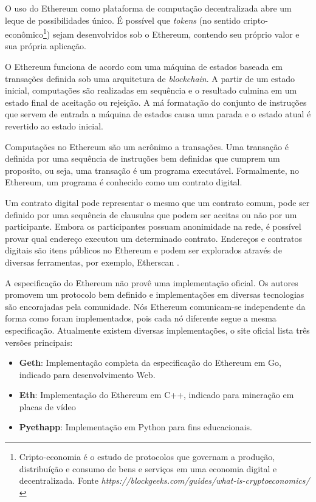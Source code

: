 \documentclass[tcc,capa]{texufpel}
\begin{document}
    O uso do Ethereum como plataforma de computação decentralizada abre um leque de possibilidades único. É possível que \textit{tokens} (no sentido cripto-econômico\footnote{Cripto-economia é o estudo de protocolos que governam a produção, distribuíção e consumo de bens e serviços em uma economia digital e decentralizada. Fonte \textit{https://blockgeeks.com/guides/what-is-cryptoeconomics/}}) sejam desenvolvidos sob o Ethereum, contendo seu próprio valor e sua própria aplicação. 
    
    O Ethereum funciona de acordo com uma máquina de estados baseada em transações definida sob uma arquitetura de \textit{blockchain}. A partir de um estado inicial, computações são realizadas em sequência e o resultado culmina em um estado final de aceitação ou rejeição. A má formatação do conjunto de instruções que servem de entrada a máquina de estados causa uma parada e o estado atual é revertido ao estado inicial.
    
    Computações no Ethereum são um acrônimo a transações. Uma transação é definida por uma sequência de instruções bem definidas que cumprem um proposito, ou seja, uma transação é um programa executável. Formalmente, no Ethereum, um programa é conhecido como um contrato digital.
    
    Um contrato digital pode representar o mesmo que um contrato comum, pode ser definido por uma sequência de clausulas que podem ser aceitas ou não por um participante. Embora os participantes possuam anonimidade na rede, é possível provar qual endereço executou um determinado contrato. Endereços e contratos digitais são itens públicos no Ethereum e podem ser explorados através de diversas ferramentas, por exemplo, Etherscan \cite{team2017etherscan}.
    
    A especificação do Ethereum não provê uma implementação oficial. Os autores promovem um protocolo bem definido e implementações em diversas tecnologias são encorajadas pela comunidade. Nós Ethereum comunicam-se independente da forma como foram implementados, pois cada nó diferente segue a mesma especificação. Atualmente existem diversas implementações, o site oficial lista três versões principais:
    
    \begin{itemize}
        \item \textbf{Geth}: Implementação completa da especificação do Ethereum em Go, indicado para desenvolvimento Web.
        \item \textbf{Eth}: Implementação do Ethereum em C++, indicado para mineração em placas de vídeo
        \item \textbf{Pyethapp}: Implementação em Python para fins educacionais.
    \end{itemize}
    
\end{document}
